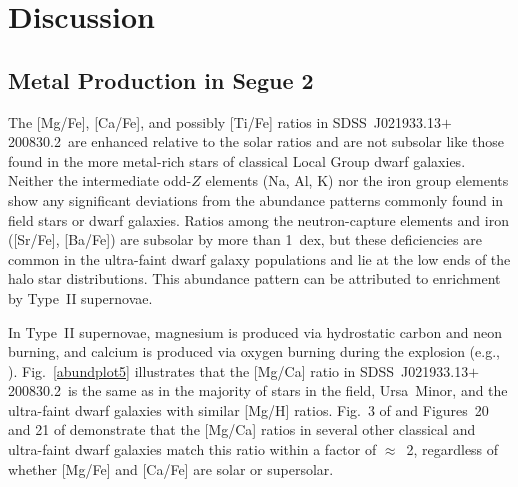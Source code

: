 \documentclass[useAMS,usenatbib,usegraphicx]{mn2e}
\def\seg{\mbox{SDSS~J021933.13$+$200830.2}}
\def\umigal{\mbox{Ursa Minor}}
\begin{document}
\section{Discussion}
\label{discussion}


\subsection{Metal Production in Segue 2}
\label{metals}


The [Mg/Fe], [Ca/Fe], and possibly [Ti/Fe] ratios in \seg\
are enhanced relative to the solar ratios
and are not subsolar like those found in the more 
metal-rich stars of classical Local Group dwarf galaxies.
Neither the intermediate odd-$Z$ elements (Na, Al, K)
nor the iron group elements show any significant deviations
from the abundance patterns
commonly found in field stars or dwarf galaxies.
Ratios among the neutron-capture elements and iron ([Sr/Fe], [Ba/Fe])
are subsolar by more than 1~dex, but these deficiencies
are common in the ultra-faint dwarf galaxy populations
and lie at the low ends of the halo star distributions.
This abundance pattern can be attributed to 
enrichment by Type~II supernovae.

In Type~II supernovae,
magnesium is produced via hydrostatic carbon and neon burning,
and calcium is produced via oxygen burning during the explosion
(e.g., \citealt{woosley95}).
Fig.~\ref{abundplot5} illustrates that the [Mg/Ca] ratio
in \seg\ is the same as in the majority of stars in the field,
\umigal, and the ultra-faint dwarf galaxies 
with similar [Mg/H] ratios.
Fig.~3 of \citet{feltzing09} and Figures~20 and 21 
of \citet{venn12} demonstrate that the [Mg/Ca]
ratios in several other classical and ultra-faint dwarf galaxies 
match this ratio within a factor of $\approx$~2,
regardless of whether [Mg/Fe] and [Ca/Fe] are 
solar or supersolar.
\end{document}
